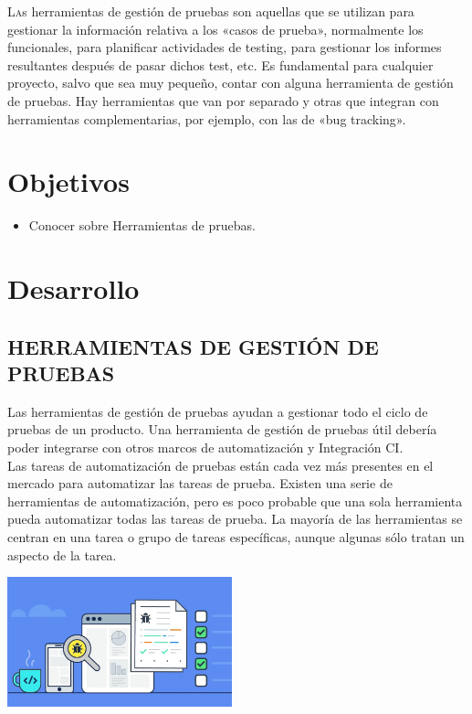 \documentclass[twoside,twocolumn]{article}
\begin{document}
\lettrine[nindent=0em,lines=3]{L}as herramientas de gestión de pruebas son aquellas que se utilizan para gestionar la información relativa a los «casos de prueba», normalmente los funcionales, para planificar actividades de testing, para gestionar los informes resultantes después de pasar dichos test, etc.
Es fundamental para cualquier proyecto, salvo que sea muy pequeño, contar con alguna herramienta de gestión de pruebas. Hay herramientas que van por separado y otras que integran con herramientas complementarias, por ejemplo, con las de «bug tracking».

\section{Objetivos}

\begin{itemize}
\item Conocer sobre Herramientas de pruebas.
\end{itemize}
\section{Desarrollo}
\subsection{HERRAMIENTAS DE GESTIÓN DE PRUEBAS}
Las herramientas de gestión de pruebas ayudan a gestionar todo el ciclo de pruebas de un producto. Una herramienta de gestión de pruebas útil debería poder integrarse con otros marcos de automatización y Integración CI.\\
Las tareas de automatización de pruebas están cada vez más presentes en el mercado para automatizar las tareas de prueba. Existen una serie de herramientas de automatización, pero es poco probable que una sola herramienta pueda automatizar todas las tareas de prueba. La mayoría de las herramientas se centran en una tarea o grupo de tareas específicas, aunque algunas sólo tratan un aspecto de la tarea.
\begin{center}
	\includegraphics[width=6.5cm]{./imagenes/testing.jpg} 
	\end{center}
\end{document}

